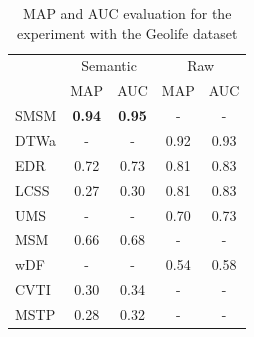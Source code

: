 \begin{table}[ht!]
  \scriptsize
  \centering
  \begin{tabular}{|l|c|c|c|c|}
  \hline
 & \multicolumn{2}{c}{Semantic}& \multicolumn{2}{|c|}{Raw}\\
 	\cline{2-5}
 & MAP & AUC & MAP & AUC\\
  	\hline
SMSM & \textbf{0.94} & \textbf{0.95} & - & -\\
DTWa & - & - & 0.92 & 0.93\\
 EDR & 0.72 & 0.73 & 0.81 & 0.83\\
LCSS & 0.27 & 0.30 & 0.81 & 0.83\\
 UMS & - & - & 0.70 & 0.73\\
 MSM & 0.66 & 0.68 & - & -\\
 wDF & - & - & 0.54 & 0.58\\
CVTI & 0.30 & 0.34 & - & -\\
MSTP & 0.28 & 0.32 & - & -\\
    \hline
  \end{tabular}
  \caption{MAP and AUC evaluation for the experiment with the Geolife dataset}
  \label{tab:geolife_measures_map_auc}
\end{table}

